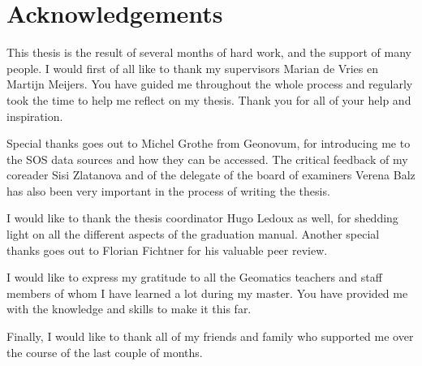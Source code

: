
\chapter*{Acknowledgements}

This thesis is the result of several months of hard work, and the support of many people. I would first of all like to thank my supervisors Marian de Vries en Martijn Meijers. You have guided me throughout the whole process and regularly took the time to help me reflect on my thesis. Thank you for all of your help and inspiration.   

Special thanks goes out to Michel Grothe from Geonovum, for introducing me to the SOS data sources and how they can be accessed. The critical feedback of my coreader Sisi Zlatanova and of the delegate of the board of examiners Verena Balz has also been very important in the process of writing the thesis. 

I would like to thank the thesis coordinator Hugo Ledoux as well, for shedding light on all the different aspects of the graduation manual. Another special thanks goes out to Florian Fichtner for his valuable peer review. 

I would like to express my gratitude to all the Geomatics teachers and staff members of whom I have learned a lot during my master. You have provided me with the knowledge and skills to make it this far. 

Finally, I would like to thank all of my friends and family who supported me over the course of the last couple of months.   